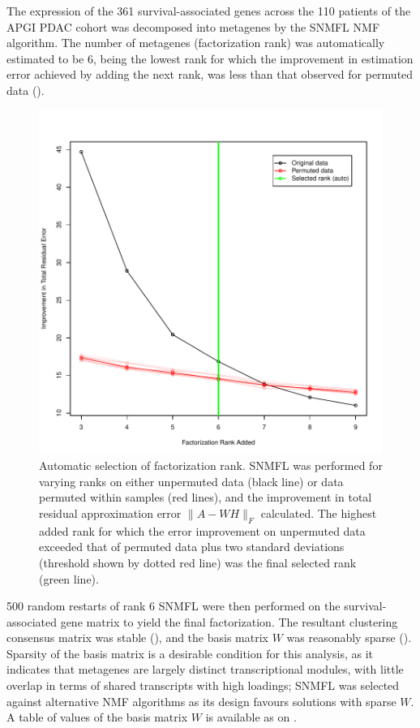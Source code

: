 \documentclass[dissertation.tex]{subfiles}
\begin{document}
The expression of the 361 survival-associated genes across the 110 patients of the \gls{APGI} \gls{PDAC} cohort was decomposed into metagenes by the \gls{SNMFL} \gls{NMF} algorithm.  The number of metagenes (factorization rank) was automatically estimated to be 6, being the lowest rank for which the improvement in estimation error achieved by adding the next rank, was less than that observed for permuted data ().

\begin{figure}
\centering
\includegraphics[width=.7\linewidth]{analysis/biosurv/reports/18_SIS_diag_dsd_final/figure/nmf-rank-plots-2}
\caption[Automatic selection of \acrshort{NMF} factorization rank]{Automatic selection of factorization rank.  \acrshort{SNMFL} was performed for varying ranks on either unpermuted data (black line) or data permuted within samples (red lines), and the improvement in total residual approximation error $\|A - W H\|_F$ calculated.  The highest added rank for which the error improvement on unpermuted data exceeded that of permuted data plus two standard deviations (threshold shown by dotted red line) was the final selected rank (green line).}\label{fig:sigs-nmf-rank}
\end{figure}

500 random restarts of rank 6 \gls{SNMFL} were then performed on the survival-associated gene matrix to yield the final factorization.  The resultant clustering consensus matrix was stable (), and the basis matrix $W$ was reasonably sparse ().  Sparsity of the basis matrix is a desirable condition for this analysis, as it indicates that metagenes are largely distinct transcriptional modules, with little overlap in terms of shared transcripts with high loadings; \gls{SNMFL} was selected against alternative \gls{NMF} algorithms as its design favours solutions with sparse $W$.  A table of values of the basis matrix $W$ is available as  on .
\end{document}
